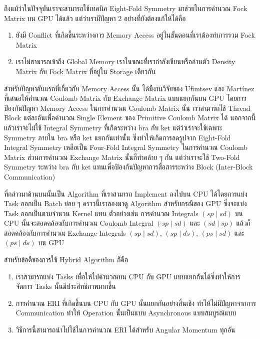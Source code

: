 ถึงแม้ว่าในปัจจุบันเราจะสามารถใช้เทคนิค Eight-Fold Symmetry มาช่วยในการคำนวณ Fock Matrix บน GPU ได้แล้ว แต่ว่าเรามีปัญหา 2 อย่างที่ยังต้องแก้ให้ได้คือ
%
\begin{enumerate}[topsep=0pt,noitemsep]
  \setlength\itemsep{0.5em}
  \item ยังมี Conflict ที่เกิดขึ้นระหว่างการ Memory Access อยู่ในขั้นตอนที่เราต้องทำการรวม Fock Matrix

  \item เราไม่สามารถเข้าถึง Global Memory เราในขณะที่เรากำลังเชียนหรืออ่านตัว Density Matrix กับ Fock Matrix ที่อยู่ใน Storage เดียวกัน
\end{enumerate}

สำหรับปัญหาอันแรกที่เกี่ยวกับ Memory Access นั้น ได้มีงานวิจัยของ Ufimtsev และ Martínez ที่เสนอให้คำนวณ Coulomb Matrix กับ Exchange Matrix แบบแยกกันบน GPU โดยการป้องกันปัญหา Memory Access ในการคำนวณ Coulomb Matrix นั้น เราสามารถใช้ Thread Block แต่ละอันเพื่อคำนวณ Single Element ของ Primitive Coulomb Matrix ได้ นอกจากนี้แล้วเราจะไม่ใช้ Integral Symmetry ที่เกิดระหว่าง bra กับ ket แต่ว่าเราจะใช้เฉพาะ Symmetry ภายใน bra หรือ ket แยกกันเท่านั้น ซึ่งทำให้เกิดการลดรูปจาก
Eight-Fold Integral Symmetry เหลือเป็น Four-Fold Integral Symmetry ในการคำนวณ Coulomb Matrix ส่วนการคำนวณ Exchange Matrix นั้นก็ทำคล้าย ๆ กัน แต่ว่าเราจะใช้ Two-Fold Symmetry ระหว่าง bra กับ ket แทนเพื่อป้องกันปัญหาการสื่อสารระหว่าง Block (Inter-Block Communication)

ที่กล่าวมาด้านบนนั้นเป็น Algorithm ที่เราสามารถ Implement ลงไปบน CPU ได้โดยการแบ่ง Task ออกเป็น Batch ย่อย ๆ คราวนี้เราลองมาดู Algorithm สำหรับกรณีของ GPU ซึ่งจะแบ่ง Task ออกเป็นตามจำนวน Kernel แทน ตัวอย่างเช่น การคำนวณ Integrals $(sp \mid sd)$ บน CPU นั้นจะสอดคล้องกับการคำนวณ Coulomb Integral $(sp \mid sd)$ และ $(sd \mid sp)$ แล้วก็สอดคล้องกับการคำนวณ Exchange Integrals $(sp \mid sd)$, $(sp \mid ds)$, $(ps \mid sd)$ และ $(ps \mid ds)$ บน GPU

สำหรับข้อดีของการใช้ Hybrid Algorithm ก็คือ
%
\begin{enumerate}[topsep=0pt,noitemsep]
  \setlength\itemsep{0.5em}
  \item เราสามารถแบ่ง Tasks เพื่อให้ไปคำนวณบน CPU กับ GPU แบบแยกกันได้ซึ่งทำให้การจัดการ Tasks นั้นมีประสิทธิภาพมากขึ้น

  \item การคำนวณ ERI ที่เกิดขึ้นบน CPU กับ GPU นั้นแยกกันอย่างสิ้นเชิง ทำให้ไม่มีปัญหาจากการ Communication ทำให้ Operation นั้นเป็นแบบ Asynchronous แบบสมบูรณ์แบบ

  \item วิธีการนี้สามารถนำไปใช้ในการคำนวณ ERI ได้สำหรับ Angular Momentum ทุกอัน
\end{enumerate}

